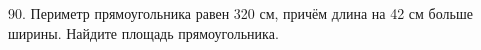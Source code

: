 90. Периметр прямоугольника равен 320 см, причём длина на 42 см больше ширины. Найдите площадь прямоугольника.\\
